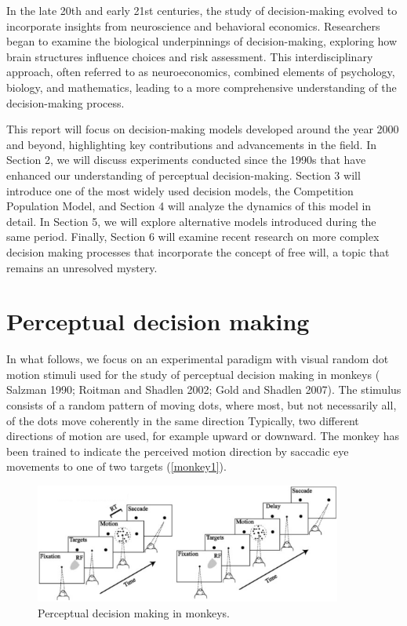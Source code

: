 \documentclass[12pt,hyperref,a4paper,UTF8]{ctexart}
\begin{document}
In the late 20th and early 21st centuries, the study of decision-making evolved to incorporate insights from neuroscience and behavioral economics. Researchers began to examine the biological underpinnings of decision-making, exploring how brain structures influence choices and risk assessment. This interdisciplinary approach, often referred to as neuroeconomics, combined elements of psychology, biology, and mathematics, leading to a more comprehensive understanding of the decision-making process.

This report will focus on decision-making models developed around the year 2000 and beyond, highlighting key contributions and advancements in the field. In Section 2, we will discuss experiments conducted since the 1990s that have enhanced our understanding of perceptual decision-making. Section 3 will introduce one of the most widely used decision models, the Competition Population Model, and Section 4 will analyze the dynamics of this model in detail. In Section 5, we will explore alternative models introduced during the same period. Finally, Section 6 will examine recent research on more complex decision making processes that incorporate the concept of free will, a topic that remains an unresolved mystery.

\newpage

\section{Perceptual decision making}

In what follows, we focus on an experimental paradigm with visual random dot motion stimuli used for the study of perceptual decision making in monkeys (\cite{Salzman 1990} Salzman 1990; \cite{Roitman and Shadlen 2002} Roitman and Shadlen 2002; \cite{Gold and Shadlen 2007} Gold and Shadlen 2007). The stimulus consists of a random pattern of moving dots, where most, but not necessarily all, of the dots move coherently in the same direction Typically, two different directions of motion are used, for example upward or downward. The monkey has been trained to indicate the perceived motion direction by saccadic eye movements to one of two targets (\autoref{monkey1}).

\begin{figure}[h]
    \begin{center}
    \includegraphics[width=0.9\textwidth]{monkey1.png}
    \caption{Perceptual decision making in monkeys.}
    \label{monkey1}
    \end{center}
\end{figure}
\end{document}
